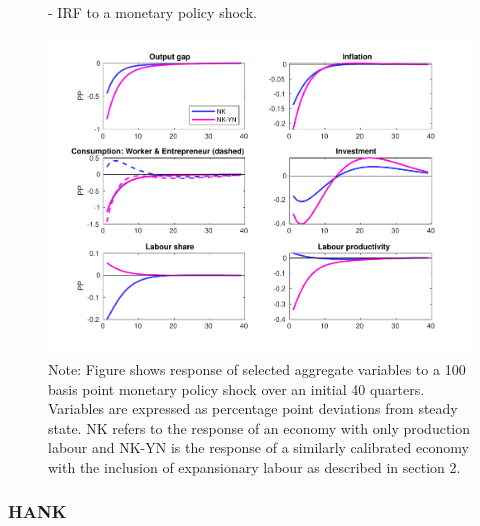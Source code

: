\documentclass[12pt]{article}
\begin{document}
\begin{figure}
\centering
\caption{\label{fig:IRF_WCNK}  - IRF to a monetary policy shock.}
\includegraphics[width=14cm]{IRF_WCNK.pdf}
\caption*{\RaggedRight \footnotesize Note: Figure shows response of selected aggregate variables to a 100 basis point monetary policy shock over an initial 40 quarters. Variables are expressed as percentage point deviations from steady state. NK refers to the response of an economy with only production labour and NK-YN is the response of a similarly calibrated economy with the inclusion of expansionary labour as described in section 2.}
\end{figure}

\subsubsection{HANK}
\end{document}
